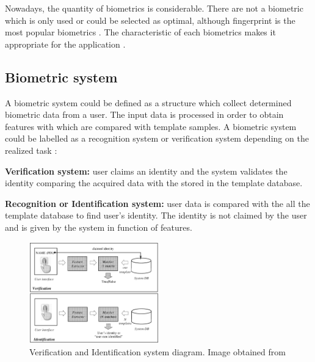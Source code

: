 Nowadays, the quantity of biometrics is considerable. There are not a biometric which is only used or could be selected as optimal, although fingerprint is the most popular biometrics \cite{2d_3d_face}. The characteristic of each biometrics makes it appropriate for the application \cite{Intro_biometrics}.\\%



\subsection{Biometric system}
A biometric system could be defined as a structure which collect determined biometric data from a user. The input data is processed in order to obtain features with which are compared with template samples. A biometric system could be labelled as a recognition system or verification system depending on the realized task \cite{Intro_biometrics2}:
\begin{description}[noitemsep,topsep=8pt,parsep=0pt,partopsep=20pt]
\item \textbf{Verification system:} user claims an identity and the system validates the identity comparing the acquired data with the stored in the template database.
\item \textbf{Recognition or Identification system:} user data is compared with the all the template database to find user's identity. The identity is not claimed by the user and is given by the system in function of features. 
\end{description}

\begin{figure}[htb]
\centering
\includegraphics[width=0.5\textwidth]{images_miscelaneus/verif_identif.PNG}
\caption{Verification and Identification system diagram. Image obtained from \cite{Intro_biometrics2}} \label{fig:Verif_ident}
\end{figure}

